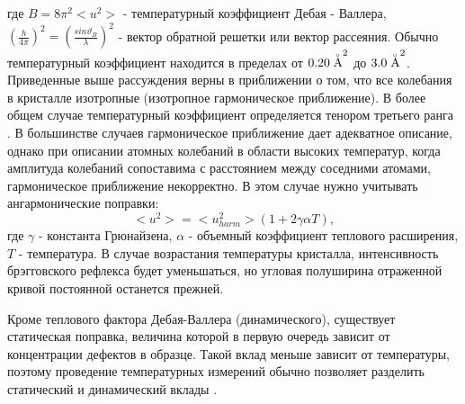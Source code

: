  где $B = 8 \pi^2 <u^2>$ - температурный коэффициент Дебая - Валлера,
 $(\frac{h}{4\pi})^2=(\frac{sin\vartheta_B}{\lambda})^2$ -
 вектор обратной решетки или вектор рассеяния. Обычно температурный коэффициент
 находится в пределах от $0.20 \angstrom ^2$ до $3.0 \angstrom ^2$.
 Приведенные выше рассуждения верны в приближении о том, что все колебания в кристалле изотропные
 (изотропное гармоническое приближение). В более общем случае
 температурный коэффициент определяется тенором третьего ранга \cite{Willis1975}.
 В большинстве случаев гармоническое приближение дает адекватное описание, однако при описании
 атомных колебаний в области высоких температур, когда амплитуда колебаний сопоставима с расстоянием
 между соседними атомами, гармоническое приближение некорректно. В этом случае нужно учитывать ангармонические
 поправки:
 \begin{equation}
 <u^2> = <u^2_{harm}> (1+2\gamma \alpha T),
\end{equation}
\noindent
где $\gamma$ - константа Грюнайзена, $\alpha$ - объемный коэффициент теплового расширения, $T$ - температура.
В случае возрастания температуры кристалла, интенсивность брэгговского рефлекса будет уменьшаться,
но угловая полуширина отраженной кривой постоянной останется прежней.

 Кроме теплового фактора Дебая-Валлера (динамического), существует статическая поправка,
 величина которой в первую очередь зависит от концентрации дефектов в образце.
 Такой вклад меньше зависит от температуры, поэтому проведение температурных измерений
 обычно позволяет разделить статический и динамический вклады \cite{kibalin2015}.


%

%
